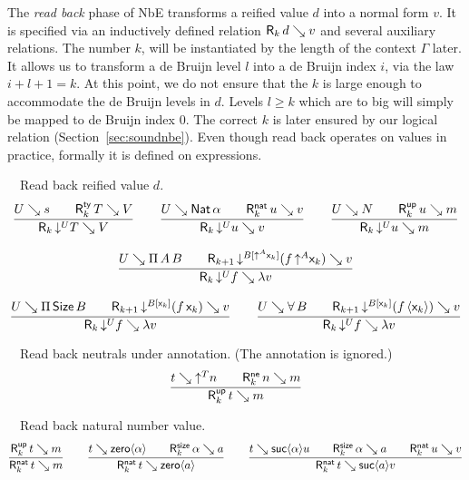 \documentclass[acmlarge,review,anonymous]{acmart}\settopmatter{printfolios=true}
\begin{document}
The \emph{read back} phase of NbE \cite{gregoireLeroy:icfp02}
transforms a reified value $d$ into a normal form $v$.  It is
specified via an inductively defined relation $\mathsf{R}_{k} \, d \searrow v$ and several auxiliary relations.
The number $k$, will be instantiated by the length of the context
$\Gamma$ later.  It allows us to transform a de Bruijn level $l$ into a de
Bruijn index $i$, via the law $i + l + 1 = k$.  At this point, we do
not ensure that the $k$ is large enough to accommodate the de Bruijn
levels in $d$.  Levels $l \geq k$ which are to big will simply be mapped
to de Bruijn index $0$.  The correct $k$ is later ensured by our
logical relation (Section~\ref{sec:soundnbe}).
Even though read back operates on values in practice, formally it is
defined on expressions.

\noindent
{}\ \ Read back reified value $d$.
\begin{gather*}
  \ru{U \evalsto s \qquad
      \RTy k T V
    }{\R k {\down{U} T} V}
\qquad
  \ru{U \evalsto \Nat \alpha \qquad
      \RNat k u v
    }{\R k {\down{U} u} v}
\qquad
  \ru{U \evalsto N \qquad
      \RUp k u m
    }{\R k {\down{U} u} m}
\\[2ex]
  \ru{U \evalsto \piT A B \qquad
      \R{k+1} {\down{B[\up A \lev k]} (f\,\up A \lev k)} v
    }{\R k {\down{U} f} {\lambda v}}
\\[2ex]
  \ru{U \evalsto \piT \Size B \qquad
      \R{k+1} {\down{B[\lev k]} (f\,\lev k)} v
    }{\R k {\down{U} f} {\lambda v}}
\qquad
  \ru{U \evalsto \forallT B \qquad
      \R{k+1} {\down{B[\lev k]} (f\,\ann{\lev k})} v
    }{\R k {\down{U} f} {\lambda v}}
\end{gather*}

\noindent
{}\ \  Read back neutrals under annotation.  (The annotation is ignored.)
\begin{gather*}
  \ru{t \evalsto \up T n \qquad
      \RNe k n m
    }{\RUp k t m}
\end{gather*}

\noindent
{}\ \ Read back natural number value.
\begin{gather*}
  \ru{%
      \RUp k t m
    }{\RNat k t m}
\qquad
  \ru{t \evalsto \zero{\alpha} \qquad
      \RSize k {\alpha} a
    }{\RNat k t {\zero a}}
\qquad
  \ru{t \evalsto \suc{\alpha}u \qquad
      \RSize k {\alpha} a \qquad
      \RNat k u v
    }{\RNat k t {\suc a v}}
\end{gather*}
\end{document}
